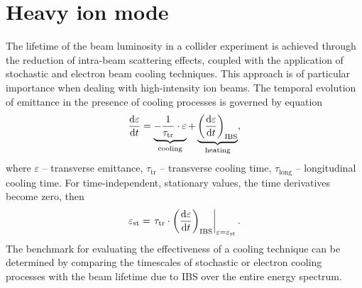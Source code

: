 \documentclass[a4paper,
               keeplastbox,   %
               ]{jacow}
\begin{document}
\section{Heavy ion mode}\label{sec.III}
	\par The lifetime of the beam luminosity in a collider experiment is achieved through the reduction of intra-beam scattering effects, coupled with the application of stochastic and electron beam cooling techniques. This approach is of particular importance when dealing with high-intensity ion beams. The temporal evolution of emittance in the presence of cooling processes is governed by equation
\begin{equation}
		\dv{\varepsilon}{t} =\underbrace{-\frac{1}{\tau_{\text{tr}}} \cdot \varepsilon}_{\text {cooling}}+\underbrace{\left(\dv{\varepsilon}{t}\right)_{\text{IBS}}}_{\text {heating}},
\end{equation}
	\noindent where $\varepsilon$ -- transverse emittance, $\tau_{\text{tr}}$ -- transverse cooling time, $\tau_{\text{long}}$ -- longitudinal cooling time.
	\noindent For time-independent, stationary values, the time derivatives become zero, then
\begin{equation}
		\varepsilon_{\textrm{st}}=\left.\tau_{\textrm{tr}} \cdot\left(\dv{\varepsilon}{t}\right)_{\textrm{IBS}}\right|_{\varepsilon=\varepsilon_{\textrm{st}}}.
\end{equation}
	The benchmark for evaluating the effectiveness of a cooling technique can be determined by comparing the timescales of stochastic or electron cooling processes with the beam lifetime due to IBS over the entire energy spectrum.
\end{document}
